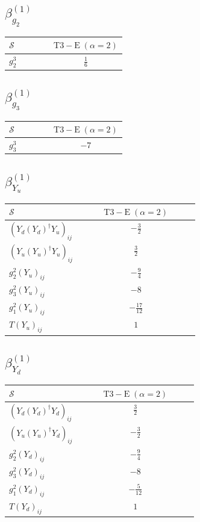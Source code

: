 \documentclass[9pt]{article}
\begin{document}
\subsection*{$ \beta_{g_2}^{(1)} $}
\begin{longtable}{@{}p{0.38\linewidth}c@{}}
\toprule
$\mathcal{S}$ & $ \mathrm{T3-E}\;(\alpha=2) $ \\
\midrule
$ g_2^3 $ & $ \frac{1}{6} $ \\
\bottomrule
\end{longtable}
\subsection*{$ \beta_{g_3}^{(1)} $}
\begin{longtable}{@{}p{0.38\linewidth}c@{}}
\toprule
$\mathcal{S}$ & $ \mathrm{T3-E}\;(\alpha=2) $ \\
\midrule
$ g_3^3 $ & $ -7 $ \\
\bottomrule
\end{longtable}
\subsection*{$ \beta_{Y_u}^{(1)} $}
\begin{longtable}{@{}p{0.38\linewidth}c@{}}
\toprule
$\mathcal{S}$ & $ \mathrm{T3-E}\;(\alpha=2) $ \\
\midrule
$ (Y_d (Y_d)^{\dagger} Y_u)_{ij} $ & $ - \frac{3}{2} $ \\
$ (Y_u (Y_u)^{\dagger} Y_u)_{ij} $ & $ \frac{3}{2} $ \\
$ g_2^2 (Y_u)_{ij} $ & $ - \frac{9}{4} $ \\
$ g_3^2 (Y_u)_{ij} $ & $ -8 $ \\
$ g_1^2 (Y_u)_{ij} $ & $ - \frac{17}{12} $ \\
$ T (Y_u)_{ij} $ & $ 1 $ \\
\bottomrule
\end{longtable}
\subsection*{$ \beta_{Y_d}^{(1)} $}
\begin{longtable}{@{}p{0.38\linewidth}c@{}}
\toprule
$\mathcal{S}$ & $ \mathrm{T3-E}\;(\alpha=2) $ \\
\midrule
$ (Y_d (Y_d)^{\dagger} Y_d)_{ij} $ & $ \frac{3}{2} $ \\
$ (Y_u (Y_u)^{\dagger} Y_d)_{ij} $ & $ - \frac{3}{2} $ \\
$ g_2^2 (Y_d)_{ij} $ & $ - \frac{9}{4} $ \\
$ g_3^2 (Y_d)_{ij} $ & $ -8 $ \\
$ g_1^2 (Y_d)_{ij} $ & $ - \frac{5}{12} $ \\
$ T (Y_d)_{ij} $ & $ 1 $ \\
\bottomrule
\end{longtable}
\end{document}
